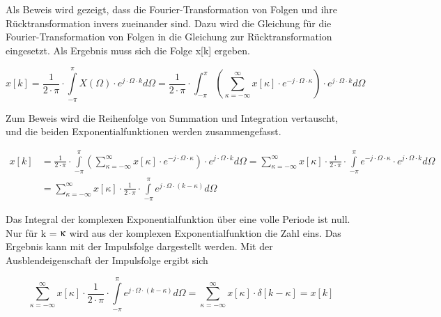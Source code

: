 \noindent Als Beweis wird gezeigt, dass die Fourier-Transformation von Folgen und ihre R\"{u}cktransformation invers zueinander sind. Dazu wird die Gleichung f\"{u}r die Fourier-Transformation von Folgen in die Gleichung zur R\"{u}cktransformation eingesetzt. Als Ergebnis muss sich die Folge x[k] ergeben.

\begin{equation}\label{eq:seventhirtysix}
x\left[k\right]=\frac{1}{2\cdot \pi } \cdot \int\limits _{-\pi }^{\pi }X\left(\Omega \right)\cdot e^{j\cdot \Omega \cdot k} d\Omega  =\frac{1}{2\cdot \pi } \cdot \int _{-\pi }^{\pi }\left(\sum _{\kappa =-\infty }^{\infty }x\left[\kappa \right]\cdot e^{-j\cdot \Omega \cdot \kappa }  \right)\cdot e^{j\cdot \Omega \cdot k}d\Omega
\end{equation}

\noindent Zum Beweis wird die Reihenfolge von Summation und Integration vertauscht, und die beiden Exponentialfunktionen werden zusammengefasst.

\begin{equation}\label{eq:seventhirtyseven}
\begin{split}
x\left[k\right] & = \frac{1}{2\cdot \pi } \cdot \int\limits _{-\pi }^{\pi }\left(\sum _{\kappa =-\infty }^{\infty }x\left[\kappa \right]\cdot e^{-j\cdot \Omega \cdot \kappa }  \right)\cdot e^{j\cdot \Omega \cdot k} d\Omega  =\sum _{\kappa =-\infty }^{\infty }x\left[\kappa \right]\cdot \frac{1}{2\cdot \pi } \cdot \int\limits _{-\pi }^{\pi }e^{-j\cdot \Omega \cdot \kappa } \cdot e^{j\cdot \Omega \cdot k} d\Omega \\
&=\sum _{\kappa =-\infty }^{\infty }x\left[\kappa \right]\cdot \frac{1}{2\cdot \pi } \cdot \int\limits _{-\pi }^{\pi } e^{j\cdot \Omega \cdot (k-\kappa)} d\Omega
\end{split}
\end{equation}

\noindent Das Integral der komplexen Exponentialfunktion \"{u}ber eine volle Periode ist null. Nur f\"{u}r k = $\kappaup$ wird aus der komplexen Exponentialfunktion die Zahl eins. Das Ergebnis kann mit der Impulsfolge dargestellt werden. Mit der Ausblendeigenschaft der Impulsfolge ergibt sich 

\begin{equation}\label{eq:seventhirtyeight}
\sum _{\kappa =-\infty }^{\infty }x\left[\kappa \right]\cdot \frac{1}{2\cdot \pi } \cdot \int\limits _{-\pi }^{\pi }e^{j\cdot \Omega \cdot \left(k-\kappa \right)} d\Omega=\sum _{\kappa =-\infty }^{\infty }x\left[\kappa \right]\cdot \delta [k-\kappa ] =x\left[k\right]
\end{equation}

